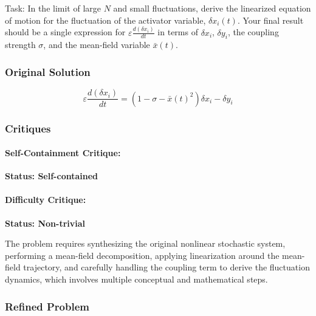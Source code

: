 \documentclass[10pt]{article}
\begin{document}
Task:
In the limit of large $N$ and small fluctuations, derive the linearized equation of motion for the fluctuation of the activator variable, $\delta x_i(t)$. Your final result should be a single expression for $\varepsilon \frac{d(\delta x_i)}{dt}$ in terms of $\delta x_i$, $\delta y_i$, the coupling strength $\sigma$, and the mean-field variable $\bar{x}(t)$.

\subsubsection*{Original Solution}
\[ \varepsilon\frac{d(\delta x_i)}{dt} = (1 - \sigma - \bar{x}(t)^2)\delta x_i - \delta y_i \]

\subsubsection*{Critiques}
\paragraph*{Self-Containment Critique:}
\textcolor{pass}{\textbf{Status: Self-contained}}




\paragraph*{Difficulty Critique:}
\textcolor{pass}{\textbf{Status: Non-trivial}}

The problem requires synthesizing the original nonlinear stochastic system, performing a mean-field decomposition, applying linearization around the mean-field trajectory, and carefully handling the coupling term to derive the fluctuation dynamics, which involves multiple conceptual and mathematical steps.


\subsubsection*{Refined Problem}
\end{document}
